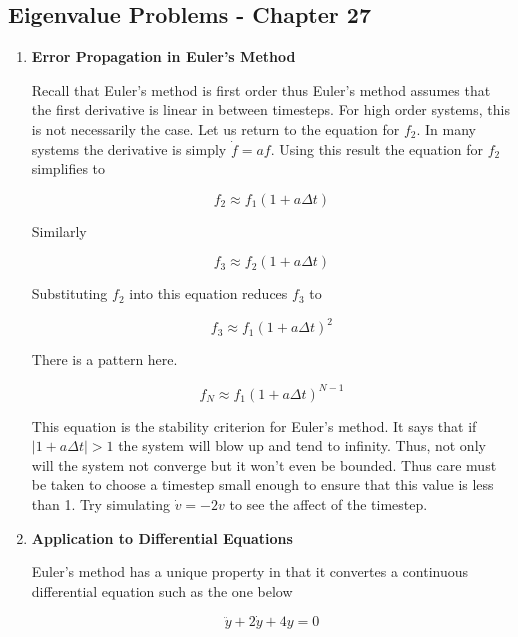 \subsection{Eigenvalue Problems - Chapter 27}

\begin{enumerate}

\item {\bf Error Propagation in Euler's Method}
  
  Recall that Euler's method is first order thus Euler's
  method assumes that the first derivative is
  linear in between timesteps. For high order systems, this is not
  necessarily the case. Let us return to the equation for
  $f_2$. In many systems the derivative is simply $\dot{f} =
  af$. Using this result the equation for $f_2$ simplifies to

  \begin{equation}
    f_2 \approx f_1 (1 +a\Delta t)
  \end{equation}

  Similarly 

  \begin{equation} 
    f_3 \approx f_2 (1 +a\Delta t)
  \end{equation}

  Substituting $f_2$ into this equation reduces $f_3$ to

  \begin{equation}
    f_3 \approx f_1 (1+a\Delta t)^2
  \end{equation}
  
  There is a pattern here. 

  \begin{equation}
    f_N \approx f_1 (1+a\Delta t)^{N-1}
  \end{equation}

  This equation is the stability criterion for Euler's method. It
  says that if $|1+a\Delta t|>1$ the system will blow up and
  tend to infinity. Thus, not only will the system not converge
  but it won't even be bounded. Thus care must be taken to choose
  a timestep small enough to ensure that this value is less than
  1. Try simulating $\dot{v} = -2 v$ to see the affect of the
  timestep. 

\item {\bf Application to Differential Equations}

  Euler's method has a unique property in that it convertes a continuous
  differential equation such as the one below  

  \begin{equation}
    \ddot{y} + 2\dot{y} + 4y = 0
  \end{equation}


\end{enumerate}
